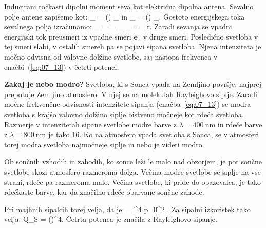 Inducirani točkasti dipolni moment seva kot električna dipolna antena. Sevalno polje antene 
zapišemo kot:
\beq
{}_ = \sin \vartheta
\left(\right) _\vartheta
\label{eq:07_11}
\eeq
in 
\beq
{}_ = \sin \vartheta
\left(\right) _\varphi.
\label{eq:07_12}
\eeq
Gostoto energijskega toka sevalnega polja izračunamo:
\beq
{}_ = \langle {} \rangle = \langle {}_
\times {}_  \rangle 
= 
_r.
\label{eq:07_13}
\eeq
Zaradi sevanja se vpadni energijski tok preusmeri iz vpadne smeri $\mathbf{e}_x$ v druge smeri. Posledično
svetloba v tej smeri slabi, v ostalih smereh pa se pojavi sipana svetloba. Njena intenziteta je močno odvisna
od valovne dolžine svetlobe, saj nastopa frekvenca v enačbi~(\ref{eq:07_13}) v četrti potenci.

\begin{example}{\bf Zakaj je nebo modro?}
Svetloba, ki s Sonca vpada na Zemljino površje, najprej prepotuje Zemljino atmosfero. V njej se na molekulah
Rayleighovo siplje. Zaradi močne frekvenčne odvisnosti intenzitete sipanja (enačba~\ref{eq:07_13}) se
modra svetloba s krajšo valovno dolžino siplje bistveno močneje kot rdeča svetloba. Razmerje v intenzitetah
sipane svetlobe modre barve z $\lambda = 400~\si{\nm}$ in rdeče barve z $\lambda = 800~\si{\nm}$ je tako 16. 
Ko na atmosfero vpada svetloba s Sonca, se v atmosferi torej modra svetloba najmočneje siplje in nebo je videti 
modro. 

Ob sončnih vzhodih in zahodih, ko sonce leži le malo nad obzorjem, je pot sončne svetlobe skozi atmosfero
razmeroma dolga. Večina modre svetlobe se siplje na vse strani, rdeče pa razmeroma malo. Večina 
svetlobe, ki pride do opazovalca, je tako rdečkaste barve, kar da značilno rdeče obarvane sončne zahode.
\end{example}

Pri majhnih sipalcih torej velja, da je:
\beq
{}_ \propto \omega^4 \Delta p_0^2 \propto {} 
\propto {}.
\label{eq:07_17}
\eeq
Za sipalni izkoristek tako velja:
\beq
Q_S =  \propto {}\propto\left(\right)^4.
\label{eq:07_18}
\eeq
Četrta potenca je značila z Rayleighovo sipanje.

